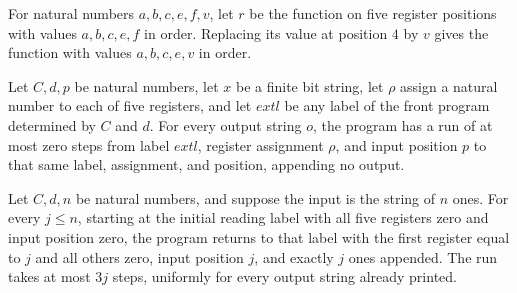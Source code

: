\begin{lemma}
\label{Complexity.UTab.Front.upd_D}
\leanok
{}
For natural numbers $a,b,c,e,f,v$, let $r$ be the function on five register positions
with values $a,b,c,e,f$ in order. Replacing its value at position $4$ by $v$ gives the
function with values $a,b,c,e,v$ in order.
\end{lemma}

\begin{lemma}
\label{Complexity.UTab.Front.goes_nil}
\leanok
{}
Let $C,d,p$ be natural numbers, let $x$ be a finite bit string, let $\rho$ assign a
natural number to each of five registers, and let $	ext{l}$ be any label of the front
program determined by $C$ and $d$. For every output string $o$, the program has a run of
at most zero steps from label $	ext{l}$, register assignment $\rho$, and input position
$p$ to that same label, assignment, and position, appending no output.
\end{lemma}

\begin{lemma}
\label{Complexity.UTab.Front.goes_read}
\leanok
{}
Let $C,d,n$ be natural numbers, and suppose the input is the string of $n$ ones. For
every $j\le n$, starting at the initial reading label with all five registers zero and
input position zero, the program returns to that label with the first register equal to
$j$ and all others zero, input position $j$, and exactly $j$ ones appended. The run
takes at most $3j$ steps, uniformly for every output string already printed.
\end{lemma}

